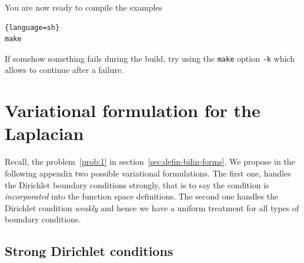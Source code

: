 \documentclass[11pt]{article}
\begin{document}
\noindent
You are now ready to compile the examples
\begin{lstlisting}{language=sh}
make
\end{lstlisting}
If somehow something fails during the build, try using the
\lstinline!make!  option \lstinline!-k! which allows to continue
after a failure.

\newpage
\section{Variational formulation for the Laplacian}
\label{sec:vari-form-1}

Recall, the problem~\ref{prob:1} in
section~\ref{sec:defin-bilin-forms}. We propose in the following
appendix two possible variational formulations. The first one, handles
the Dirichlet boundary conditions strongly, that is to say the
condition is \emph{incorporated} into the function space definitions.
The second one handles the Dirichlet condition \emph{weakly} and hence
we have a uniform treatment for all types of boundary conditions.



\subsection{Strong Dirichlet conditions}
\label{sec:strong-dirichl-cond}
\end{document}
